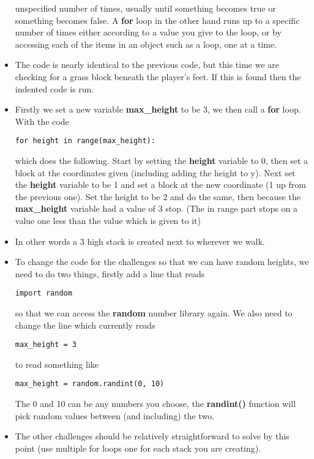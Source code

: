\documentclass{geocraft-lesson-plan}
\begin{document}
\begin{itemize}
  unspecified number of times, usually until something becomes true or something becomes false. A \textbf{for} loop in
  the other hand runs up to a specific number of times either according to a value you give to the loop, or by accessing
  each of the items in an object such as a loop, one at a time.
\item The code is nearly identical to the previous code, but this time we are checking for a grass block beneath the
  player's feet. If this is found then the indented code is run.
\item Firstly we set a new variable \textbf{max\_height} to be  3, we then call a \textbf{for} loop. With the code
  \begin{verbatim}for height in range(max_height):\end{verbatim} which does the following. Start by setting the \textbf{height} variable to
  0, then set a block at the coordinates given (including adding the height to y). Next set the \textbf{height} variable
  to be 1 and set a block at the new coordinate (1 up from the previous one). Set the height to be 2 and do the same,
  then because the \textbf{max\_height} variable had a value of 3 stop. (The in range part stops on a value one less than
  the value which is given to it)
\item In other words a 3 high stack is created next to wherever we walk.
\item To change the code for the challenges so that we can have random heights, we need to do two things, firstly add a
  line that reads \begin{verbatim}import random\end{verbatim}so that we can access the \textbf{random} number library
  again. We also need to change the line which currently reads \begin{verbatim}max_height = 3\end{verbatim} to read
  something like \begin{verbatim}max_height = random.randint(0, 10)\end{verbatim}The 0 and 10 can be any numbers you
  choose, the \textbf{randint()} function will pick random values between (and including) the two. 
\item The other challenges should be relatively straightforward to solve by this point (use multiple for loops one for
  each stack you are creating). 
\end{itemize}
\end{document}
